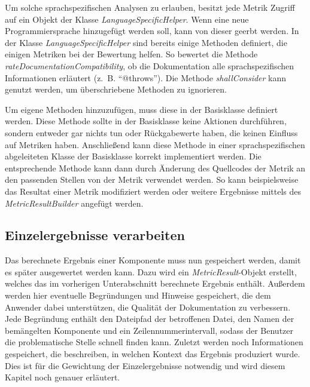 Um solche sprachspezifischen Analysen zu erlauben, besitzt jede Metrik Zugriff auf ein Objekt der Klasse \textit{LanguageSpecificHelper}. Wenn eine neue Programmiersprache hinzugefügt werden soll, kann von dieser geerbt werden. In der Klasse \textit{LanguageSpecificHelper} sind bereits einige Methoden definiert, die einigen Metriken bei der Bewertung helfen. So bewertet die Methode \textit{rateDocumentationCompatibility}, ob die Dokumentation alle sprachspezifischen Informationen erläutert (z.~B. \enquote{@throws}). Die Methode \textit{shallConsider} kann genutzt werden, um überschriebene Methoden zu ignorieren. 

Um eigene Methoden hinzuzufügen, muss diese in der Basisklasse definiert werden. Diese Methode sollte in der Basisklasse keine Aktionen durchführen, sondern entweder gar nichts tun oder Rückgabewerte haben, die keinen Einfluss auf Metriken haben. Anschließend kann diese Methode in einer sprachspezifischen abgeleiteten Klasse der Basisklasse korrekt implementiert werden. Die entsprechende Methode kann dann durch Änderung des Quellcodes der Metrik an den passenden Stellen von der Metrik verwendet werden. So kann beispielsweise das Resultat einer Metrik modifiziert werden oder weitere Ergebnisse mittels des \textit{MetricResultBuilder} angefügt werden.

\subsection{Einzelergebnisse verarbeiten}\label{chapter:store_metric}

Das berechnete Ergebnis einer Komponente muss nun gespeichert werden, damit es später ausgewertet werden kann. Dazu wird ein \textit{MetricResult}-Objekt erstellt, welches das im vorherigen Unterabschnitt berechnete Ergebnis enthält. Außerdem werden hier eventuelle Begründungen und Hinweise gespeichert, die dem Anwender dabei unterstützen, die Qualität der Dokumentation zu verbessern. Jede Begründung enthält den Dateipfad der betroffenen Datei, den Namen der bemängelten Komponente und ein Zeilennummerintervall, sodass der Benutzer die problematische Stelle schnell finden kann. Zuletzt werden noch Informationen gespeichert, die beschreiben, in welchen Kontext das Ergebnis produziert wurde. Dies ist für die Gewichtung der Einzelergebnisse notwendig und wird diesem Kapitel noch genauer erläutert. 

